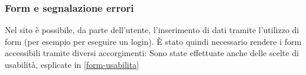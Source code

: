\subsubsection{Form e segnalazione errori}
\label{form-accessibilita}
Nel sito è possibile, da parte dell'utente, l'inserimento di dati tramite l'utilizzo di form (per esempio per eseguire un login). È stato quindi necessario rendere i form accessibili tramite diversi accorgimenti: %
Sono state effettuate anche delle scelte di usabilità, esplicate in \ref{form-usabilita}
